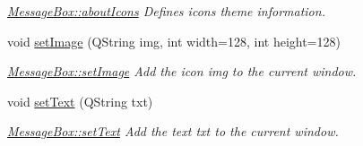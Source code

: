 \begin{DoxyCompactItemize}
\begin{DoxyCompactList}\small\item\em \hyperlink{classMessageBox_a9ffe14eb394b925e2a9a5a47c5f63238}{Message\+Box\+::about\+Icons} Defines icons theme information. \end{DoxyCompactList}\item 
void \hyperlink{classMessageBox_a9b5ddfd71ace7cd38f383f5c011ce37a}{set\+Image} (Q\+String img, int width=128, int height=128)
\begin{DoxyCompactList}\small\item\em \hyperlink{classMessageBox_a9b5ddfd71ace7cd38f383f5c011ce37a}{Message\+Box\+::set\+Image} Add the icon {\itshape img} to the current window. \end{DoxyCompactList}\item 
void \hyperlink{classMessageBox_a98245b5ce8053833fe6b1f3900e85fe2}{set\+Text} (Q\+String txt)
\begin{DoxyCompactList}\small\item\em \hyperlink{classMessageBox_a98245b5ce8053833fe6b1f3900e85fe2}{Message\+Box\+::set\+Text} Add the text {\itshape txt} to the current window. \end{DoxyCompactList}\end{DoxyCompactItemize}
